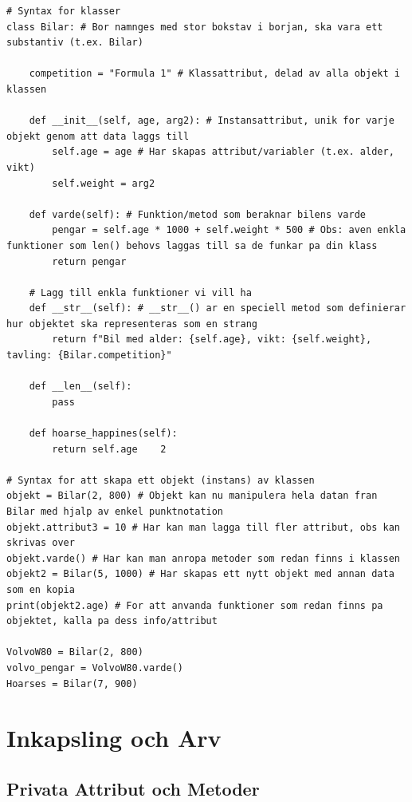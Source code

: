 \documentclass[10pt,a4paper]{report}
\begin{document}
\begin{lstlisting}
# Syntax for klasser
class Bilar: # Bor namnges med stor bokstav i borjan, ska vara ett substantiv (t.ex. Bilar)

    competition = "Formula 1" # Klassattribut, delad av alla objekt i klassen

    def __init__(self, age, arg2): # Instansattribut, unik for varje objekt genom att data laggs till
        self.age = age # Har skapas attribut/variabler (t.ex. alder, vikt)
        self.weight = arg2
    
    def varde(self): # Funktion/metod som beraknar bilens varde
        pengar = self.age * 1000 + self.weight * 500 # Obs: aven enkla funktioner som len() behovs laggas till sa de funkar pa din klass
        return pengar

    # Lagg till enkla funktioner vi vill ha
    def __str__(self): # __str__() ar en speciell metod som definierar hur objektet ska representeras som en strang
        return f"Bil med alder: {self.age}, vikt: {self.weight}, tavling: {Bilar.competition}"
    
    def __len__(self):
        pass
    
    def hoarse_happines(self):
        return self.age    2

# Syntax for att skapa ett objekt (instans) av klassen
objekt = Bilar(2, 800) # Objekt kan nu manipulera hela datan fran Bilar med hjalp av enkel punktnotation
objekt.attribut3 = 10 # Har kan man lagga till fler attribut, obs kan skrivas over
objekt.varde() # Har kan man anropa metoder som redan finns i klassen
objekt2 = Bilar(5, 1000) # Har skapas ett nytt objekt med annan data som en kopia
print(objekt2.age) # For att anvanda funktioner som redan finns pa objektet, kalla pa dess info/attribut

VolvoW80 = Bilar(2, 800)
volvo_pengar = VolvoW80.varde()
Hoarses = Bilar(7, 900)
\end{lstlisting}

\chapter{Inkapsling och Arv}

\section{Privata Attribut och Metoder}
\end{document}
